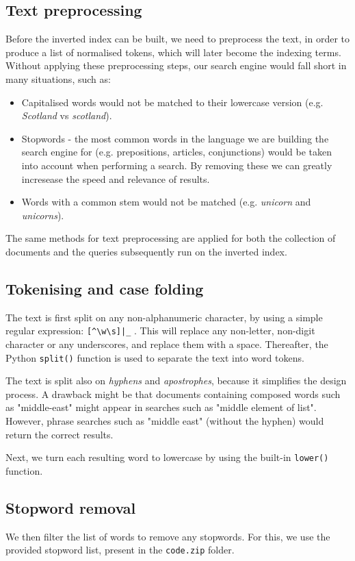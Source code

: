 \documentclass[11pt]{article}
\begin{document}
\begin{multicols}{2}
\section{Text preprocessing} \label{preprocessing}
Before the inverted index can be built, we need to preprocess the text, in order to produce a list of normalised tokens, which will later become the indexing terms. Without applying these preprocessing steps, our search engine would fall short in many situations, such as:
\begin{itemize}
	\item Capitalised words would not be matched to their lowercase version (e.g. \textit{Scotland} vs \textit{scotland}).
	\item Stopwords - the most common words in the language we are building the search engine for (e.g. prepositions, articles, conjunctions) would be taken into account when performing a search. By removing these we can greatly incresease the speed and relevance of results.
	\item Words with a common stem would not be matched (e.g. \textit{unicorn} and \textit{unicorns}).
\end{itemize}

The same methods for text preprocessing are applied for both the collection of documents and the queries subsequently run on the inverted index.

\subsection{Tokenising and case folding}
The text is first split on any non-alphanumeric character, by using a simple regular expression:
\verb![^\w\s]|_!
. This will replace any non-letter, non-digit character or any underscores, and replace them with a space. Thereafter, the Python \verb!split()! function is used to separate the text into word tokens. 

The text is split also on \textit{hyphens} and \textit{apostrophes}, because it simplifies the design process. A drawback might be that documents containing composed words such as "middle-east" might appear in searches such as "middle element of list". However, phrase searches such as "middle east" (without the hyphen) would return the correct results.

Next, we turn each resulting word to lowercase by using the built-in \verb!lower()! function.

\subsection{Stopword removal}
We then filter the list of words to remove any stopwords. For this, we use the provided stopword list, present in the \verb!code.zip! folder. 


\end{multicols}
\end{document}
